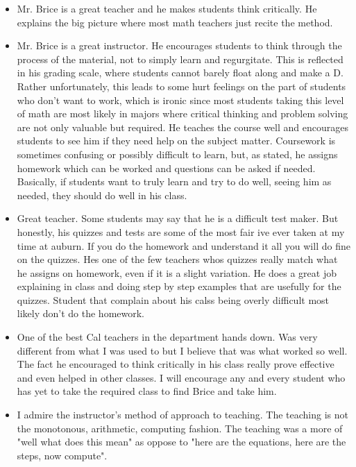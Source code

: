 \documentclass[11pt]{article}
\begin{document}
	\begin{itemize}
		
		\item{} Mr. Brice is a great teacher and he makes students think critically. He explains the big picture where most math teachers just recite the method.
		
		\item{} Mr. Brice is a great instructor. He encourages students to think through the process of the material, not to simply learn and regurgitate. This is reflected in his grading scale, where students cannot barely float along and make a D. Rather unfortunately, this leads to some hurt feelings on the part of students who don't want to work, which is ironic since most students taking this level of math are most likely in majors where critical thinking and problem solving are not only valuable but required. He teaches the course well and encourages students to see him if they need help on the subject matter. Coursework is sometimes confusing or possibly difficult to learn, but, as stated, he assigns homework which can be worked and questions can be asked if needed. Basically, if students want to truly learn and try to do well, seeing him as needed, they should do well in his class.
		
		\item{} Great teacher. Some students may say that he is a difficult test maker. But honestly, his quizzes and tests are some of the most fair ive ever taken at my time at auburn. If you do the homework and understand it all you will do fine on the quizzes. Hes one of the few teachers whos quizzes really match what he assigns on homework, even if it is a slight variation. He does a great job explaining in class and doing step by step examples that are usefully for the quizzes. Student that complain about his calss being overly difficult most likely don't do the homework.
		
		\item{} One of the best Cal teachers in the department hands down. Was very different from what I was used to but I believe that was what worked so well. The fact he encouraged to think critically in his class really prove effective and even helped in other classes. I will encourage any and every student who has yet to take the required class to find Brice and take him.

		\item{} I admire the instructor's method of approach to teaching. The teaching is not the monotonous, arithmetic, computing fashion. The teaching was a more of "well what does this mean" as oppose to "here are the equations, here are the steps, now compute".


\end{itemize}
\end{document}
